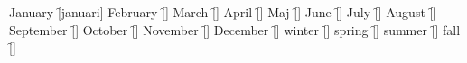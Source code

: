 \begin{questions}
    \begin{multicols}{2}
        \raggedcolumns
        \question January \f[januari]
        \question February \f[]
        \question March \f[]
        \question April \f[]
        \question Maj \f[]
        \question June \f[]
        \question July \f[]
        \question August \f[]
        \question September \f[]
        \question October \f[]
        \question November \f[]
        \question December \f[]
        \question winter \f[]
        \question spring \f[]
        \question summer \f[]
        \question fall \f[]
    \end{multicols}
\end{questions}
